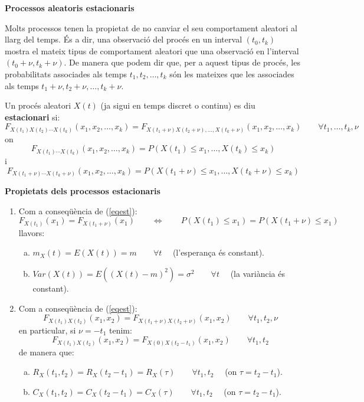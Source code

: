 \documentclass{article}
\begin{document}
\textbf{\Large Processos aleatoris estacionaris}

Molts processos tenen la propietat de no canviar el seu comportament aleatori al llarg del temps.
\'Es a dir, una observaci\'o del proc\'es en un interval $(t_0, t_k)$ mostra el mateix tipus de 
comportament aleatori que una observaci\'o en l'interval $(t_0+\nu, t_k+\nu)$. De manera que 
podem dir que, per a aquest tipus de proc\'es, les probabilitats associades als temps 
$t_1, t_2, \dots, t_k$ s\'on les mateixes que les associades als temps $t_1+\nu, t_2+\nu, \dots, t_k+\nu$.

Un proc\'es aleatori $X(t)$ (ja sigui en temps discret o continu) es diu {\bf estacionari} si:
\begin{equation}
\label{eqest}
F_{X(t_1) X(t_2) \cdots X(t_k)}(x_1, x_2, \dots, x_k)=
F_{X(t_1+\nu) X(t_2+\nu), \dots, X(t_k+\nu)}(x_1, x_2, \dots, x_k) \qquad \forall t_1, \dots, t_k, \nu
\end{equation}
\noindent
on $$F_{X(t_1) \cdots X(t_k)}(x_1, x_2, \dots, x_k)=P(X(t_1) \leq x_1, \dots, X(t_k) \leq x_k)$$ i
$$F_{X(t_1+\nu) \cdots X(t_k+\nu)}(x_1, x_2, \dots, x_k)=P(X(t_1+\nu) \leq x_1, \dots, X(t_k+\nu) \leq x_k)$$

\textbf{\large Propietats dels processos estacionaris}

\begin{enumerate}[1.]
\item Com a conseq\"u\`encia de (\ref{eqest}):
\[
F_{X(t_1)}(x_1)=F_{X(t_1+\nu)}(x_1) \qquad \iff \qquad P(X(t_1) \leq x_1)=P(X(t_1+\nu) \leq x_1)
\]
\noindent
llavors:
\begin{enumerate}[a)]
\item $m_X(t)=E(X(t))=m \qquad \forall t \quad$ (l'esperan\c{c}a \'es constant).
\item $Var(X(t))=E((X(t)-m)^2)=\sigma^2 \qquad \forall t \quad$ (la vari\`ancia \'es constant).
\end{enumerate}

\item Com a conseq\"u\`encia de (\ref{eqest}):
\[
F_{X(t_1) X(t_2)}(x_1, x_2)=F_{X(t_1 + \nu) X(t_2 + \nu)} (x_1, x_2) \qquad \forall t_1, t_2, \nu
\]
\noindent
en particular, si $\nu=-t_1$ tenim:
\[
F_{X(t_1) X(t_2)}(x_1, x_2)=F_{X(0) X(t_2-t_1)}(x_1, x_2) \qquad \forall t_1, t_2
\]
\noindent
de manera que:
\begin{enumerate}[a)]
\item $R_X(t_1, t_2)=R_X(t_2-t_1)=R_X(\tau) \qquad \forall t_1, t_2 \quad$ (on $\tau=t_2-t_1$).
\item $C_X(t_1, t_2)=C_X(t_2-t_1)=C_X(\tau) \qquad \forall t_1, t_2 \quad$ (on $\tau=t_2-t_1$).
\end{enumerate}

\end{enumerate}
\end{document}

